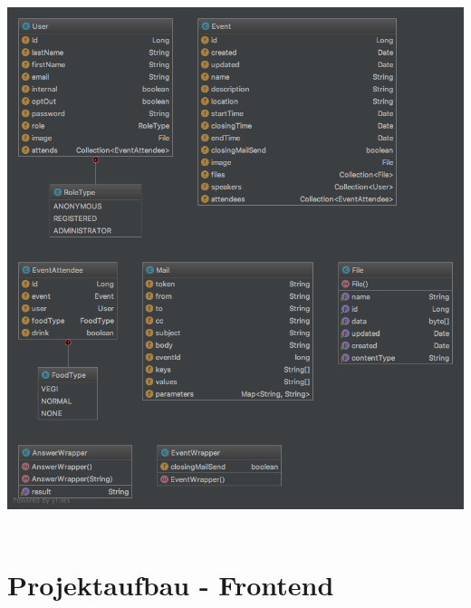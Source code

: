 \documentclass[11pt]{article} %
\begin{document}
\includegraphics[width=1.0\textwidth]{class-diagrams/Scheduler-domain}
\\
\\


\newpage
\section{Projektaufbau - Frontend}
\end{document}
